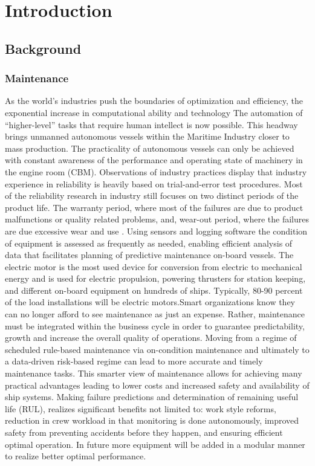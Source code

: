 \section{Introduction}
\label{sec:introduction}
\subsection{Background}
\subsubsection{Maintenance}
As the world’s industries push the boundaries of optimization and efficiency, the exponential increase in computational ability and technology The automation of “higher-level” tasks that require human intellect is now possible. This headway brings unmanned autonomous vessels within the Maritime Industry closer to mass production. The practicality of autonomous vessels can only be achieved with constant awareness of the performance and operating state of machinery in the engine room (CBM). Observations of industry practices display that industry experience in reliability is heavily based on trial-and-error test procedures. Most of the reliability research in industry still focuses on two distinct periods of the product life. The warranty period, where most of the failures are due to product malfunctions or quality related problems, and, wear-out period, where the failures are due excessive wear and use \cite{thomas_warranty_1999}. Using sensors and logging software the condition of equipment is assessed as frequently as needed, enabling efficient analysis of data that facilitates planning of predictive maintenance on-board vessels. The electric motor is the most used device for conversion from electric to mechanical energy and is used for electric propulsion, powering thrusters for station keeping, and different on-board equipment on hundreds of ships. Typically, 80-90 percent of the load installations will be electric motors\cite{han_motor_2019}.Smart organizations know they can no longer afford to see maintenance as just an expense. Rather, maintenance must be integrated within the business cycle in order to guarantee predictability, growth and increase the overall quality of operations. Moving from a regime of scheduled rule-based maintenance via on-condition maintenance and ultimately to a data-driven risk-based regime can lead to more accurate and timely maintenance tasks. This smarter view of maintenance allows for achieving many practical advantages leading to lower costs and increased safety and availability of ship systems\cite{han_motor_2019}. 
 Making failure predictions and determination of remaining useful life (RUL), realizes significant benefits not limited to: work style reforms, reduction in crew workload in that monitoring is done autonomously, improved safety from preventing accidents before they happen, and ensuring efficient optimal operation. In future more equipment will be added in a modular manner to realize better optimal performance.  

